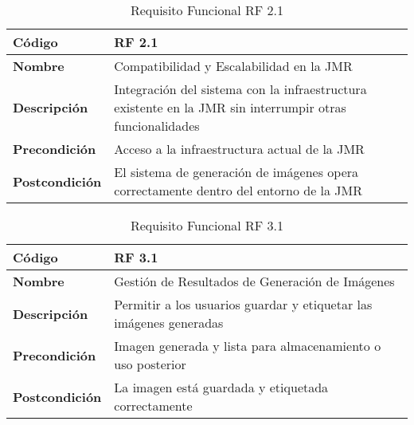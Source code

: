 \begin{table}[H]
    \centering 
    \renewcommand{\arraystretch}{1.5} 
    \begin{tabular}{|l|p{12cm}|} 
        \hline \rowcolor{gray!30} 
        \textbf{Código} & \textbf{RF 2.1} \\
        \hline
        \textbf{Nombre} & Compatibilidad y Escalabilidad en la JMR \\
        \hline 
        \textbf{Descripción} & Integración del sistema con la infraestructura existente en la JMR sin interrumpir otras funcionalidades \\
        \hline 
        \textbf{Precondición} & Acceso a la infraestructura actual de la JMR \\
        \hline
        \textbf{Postcondición} & El sistema de generación de imágenes opera correctamente dentro del entorno de la JMR \\ 
        \hline 
    \end{tabular} 
    \caption{Requisito Funcional RF 2.1} 
    \label{tab:reqfun2}
\end{table}

\begin{table}[H] 
    \centering 
    \renewcommand{\arraystretch}{1.5} 
    \begin{tabular}{|l|p{12cm}|} 
        \hline \rowcolor{gray!30} 
        \textbf{Código} & \textbf{RF 3.1} \\
        \hline
        \textbf{Nombre} & Gestión de Resultados de Generación de Imágenes \\
        \hline 
        \textbf{Descripción} & Permitir a los usuarios guardar y etiquetar las imágenes generadas \\
        \hline
        \textbf{Precondición} & Imagen generada y lista para almacenamiento o uso posterior \\
        \hline 
        \textbf{Postcondición} & La imagen está guardada y etiquetada correctamente \\ 
        \hline 
    \end{tabular} 
    \caption{Requisito Funcional RF 3.1} 
    \label{tab:reqfun3}
\end{table}

